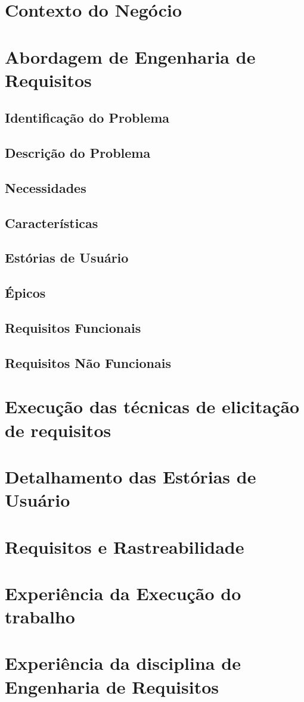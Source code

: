 \chapter{Contexto do Negócio}

\chapter{Abordagem de Engenharia de Requisitos}

  \section{Identificação do Problema}

  \section{Descrição do Problema}

  \section{Necessidades}

  \section{Características}

  \section{Estórias de Usuário}

  \section{Épicos}

  \section{Requisitos Funcionais}

  \section{Requisitos Não Funcionais}

\chapter{Execução das técnicas de elicitação de requisitos}

\chapter{Detalhamento das Estórias de Usuário}

\chapter{Requisitos e Rastreabilidade}

\chapter{Experiência da Execução do trabalho}

\chapter{Experiência da disciplina de Engenharia de Requisitos}
